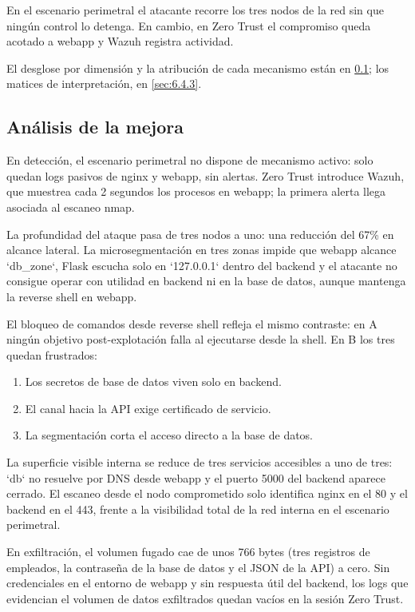 \documentclass[11pt,spanish,listoffigures,listoftables]{tfgetsinf}
\begin{document}
        En el escenario perimetral el atacante recorre los tres nodos de la red sin que ningún control lo detenga. En cambio, en Zero Trust el compromiso queda acotado a webapp y Wazuh registra actividad. 
        
        El desglose por dimensión y la atribución de cada mecanismo están en \cref{sec:6.4.2}; los matices de interpretación, en \cref{sec:6.4.3}.
        
        \subsection{Análisis de la mejora}
        \label{sec:6.4.2}

        En detección, el escenario perimetral no dispone de mecanismo activo: solo quedan logs pasivos de nginx y webapp, sin alertas. Zero Trust introduce Wazuh, que muestrea cada 2 segundos los procesos en webapp; la primera alerta llega asociada al escaneo nmap.

        La profundidad del ataque pasa de tres nodos a uno: una reducción del 67\% en alcance lateral. La microsegmentación en tres zonas impide que webapp alcance `db\_zone`, Flask escucha solo en `127.0.0.1` dentro del backend y el atacante no consigue operar con utilidad en backend ni en la base de datos, aunque mantenga la reverse shell en webapp.
        
        El bloqueo de comandos desde reverse shell refleja el mismo contraste: en A ningún objetivo post-explotación falla al ejecutarse desde la shell. En B los tres quedan frustrados:
        \begin{enumerate}
            \item Los secretos de base de datos viven solo en backend.
            \item El canal hacia la API exige certificado de servicio.
            \item La segmentación corta el acceso directo a la base de datos.
        \end{enumerate}
        
        La superficie visible interna se reduce de tres servicios accesibles a uno de tres: `db` no resuelve por DNS desde webapp y el puerto 5000 del backend aparece cerrado. El escaneo desde el nodo comprometido solo identifica nginx en el 80 y el backend en el 443, frente a la visibilidad total de la red interna en el escenario perimetral.
        
        En exfiltración, el volumen fugado cae de unos 766 bytes (tres registros de empleados, la contraseña de la base de datos y el JSON de la API) a cero. Sin credenciales en el entorno de webapp y sin respuesta útil del backend, los logs que evidencian el volumen de datos exfiltrados quedan vacíos en la sesión Zero Trust.
        
\end{document}
